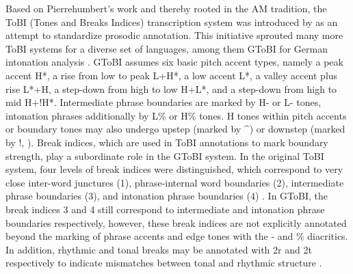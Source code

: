 Based on Pierrehumbert's \citeyearpar{pierrehumbertPhonologyPhoneticsEnglish1980} work and thereby rooted in the AM tradition, the ToBI (Tones and Breaks Indices) transcription system was introduced by \citet{silvermanTOBIStandardLabeling1992} as an attempt to standardize prosodic annotation. This initiative sprouted many more ToBI systems for a diverse set of languages, among them GToBI for German intonation analysis \citep{griceGermanIntonationAutosegmentalMetrical2005}. GToBI assumes six basic pitch accent types, namely a peak accent H*, a rise from low to peak L+H*, a low accent L*, a valley accent plus rise L*+H, a step-down from high to low H+L*, and a step-down from high to mid H+!H*. Intermediate phrase boundaries are marked by H- or L- tones, intonation phrases additionally by L\% or H\% tones. H tones within pitch accents or boundary tones may also undergo upstep (marked by \textasciicircum) or downstep (marked by !, \citealt[see][67-69 for details]{griceGermanIntonationAutosegmentalMetrical2005}). Break indices, which are used in ToBI annotations to mark boundary strength, play a subordinate role in the GToBI system. In the original ToBI system, four levels of break indices were distinguished, which correspond to very close inter-word junctures (1), phrase-internal word boundaries (2), intermediate phrase boundaries (3), and intonation phrase boundaries (4) \citep{silvermanTOBIStandardLabeling1992, beckmanOriginalToBiSystem2005}. In GToBI, the break indices 3 and 4 still correspond to intermediate and intonation phrase boundaries respectively, however, these break indices are not explicitly annotated beyond the marking of phrase accents and edge tones with the - and \% diacritics. In addition, rhythmic and tonal breaks may be annotated with 2r and 2t respectively to indicate mismatches between tonal and rhythmic structure \citep{griceGermanIntonationAutosegmentalMetrical2005}.


